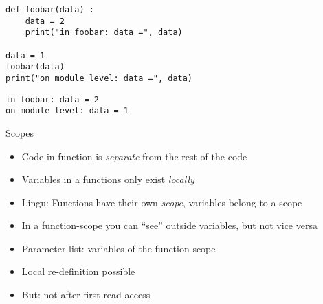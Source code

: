 \begin{frame}[fragile]
\begin{tcolorbox}[title=Memory Model]
\begin{center}
\end{center}
\end{tcolorbox}
%
\end{frame}


\begin{frame}[fragile]
%
\begin{codebox}
\begin{verbatim}
def foobar(data) :
    data = 2
    print("in foobar: data =", data)

data = 1
foobar(data)
print("on module level: data =", data)
\end{verbatim}
\end{codebox}

\begin{cmdbox}
\begin{verbatim}
in foobar: data = 2
on module level: data = 1
\end{verbatim}
\end{cmdbox}
%
\end{frame}


\begin{frame}{Scopes}
%
\begin{itemize}
\item Code in function is \emph{separate} from the rest of the code
\item Variables in a functions only exist \emph{locally}
\item Lingu: Functions have their own \emph{scope}, variables belong to a scope
\item In a function-scope you can \enquote{see} outside variables, but not vice versa
\item Parameter list: variables of the function scope
\item Local re-definition possible
\item But: not after first read-access
\end{itemize}
%
\end{frame}

